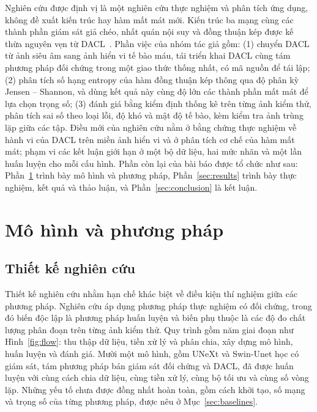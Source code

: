 \documentclass{IEEEtran}
\begin{document}
Nghiên cứu được định vị là một nghiên cứu thực nghiệm và phân tích ứng dụng, không đề xuất kiến trúc hay hàm mất mát mới. Kiến trúc ba mạng cùng các thành phần giám sát giả chéo, nhất quán nội suy và đồng thuận kép được kế thừa nguyên vẹn từ DACL~\cite{dacl}. Phần việc của nhóm tác giả gồm: (1) chuyển DACL từ ảnh siêu âm sang ảnh hiển vi tế bào máu, tái triển khai DACL cùng tám phương pháp đối chứng trong một giao thức thống nhất, có mã nguồn để tái lập; (2) phân tích số hạng entropy của hàm đồng thuận kép thông qua độ phân kỳ Jensen -- Shannon, và dùng kết quả này cùng độ lớn các thành phần mất mát để lựa chọn trọng số; (3) đánh giá bằng kiểm định thống kê trên từng ảnh kiểm thử, phân tích sai số theo loại lỗi, độ khó và mật độ tế bào, kèm kiểm tra ảnh trùng lặp giữa các tập. Điều mới của nghiên cứu nằm ở bằng chứng thực nghiệm về hành vi của DACL trên miền ảnh hiển vi và ở phân tích cơ chế của hàm mất mát; phạm vi các kết luận giới hạn ở một bộ dữ liệu, hai mức nhãn và một lần huấn luyện cho mỗi cấu hình. Phần còn lại của bài báo được tổ chức như sau: Phần~\ref{sec:method} trình bày mô hình và phương pháp, Phần~\ref{sec:results} trình bày thực nghiệm, kết quả và thảo luận, và Phần~\ref{sec:conclusion} là kết luận.

\section{Mô hình và phương pháp}
\label{sec:method}

\subsection{Thiết kế nghiên cứu}

Thiết kế nghiên cứu nhằm hạn chế khác biệt về điều kiện thí nghiệm giữa các phương pháp. Nghiên cứu áp dụng phương pháp thực nghiệm có đối chứng, trong đó biến độc lập là phương pháp huấn luyện và biến phụ thuộc là các độ đo chất lượng phân đoạn trên từng ảnh kiểm thử. Quy trình gồm năm giai đoạn như Hình~\ref{fig:flow}: thu thập dữ liệu, tiền xử lý và phân chia, xây dựng mô hình, huấn luyện và đánh giá. Mười một mô hình, gồm UNeXt và Swin-Unet học có giám sát, tám phương pháp bán giám sát đối chứng và DACL, đã được huấn luyện với cùng cách chia dữ liệu, cùng tiền xử lý, cùng bộ tối ưu và cùng số vòng lặp. Những yếu tố chưa được đồng nhất hoàn toàn, gồm cách khởi tạo, số mạng và trọng số của từng phương pháp, được nêu ở Mục~\ref{sec:baselines}.
\end{document}
